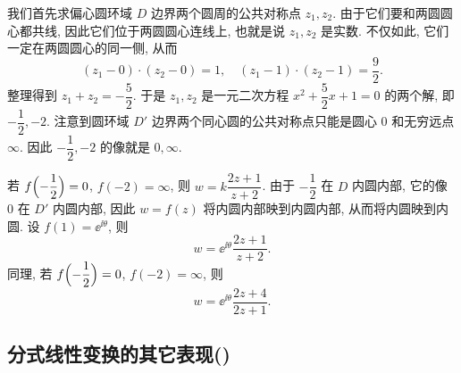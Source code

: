 \begin{solution}
  我们首先求偏心圆环域 $D$ 边界两个圆周的公共对称点 $z_1,z_2$.
  由于它们要和两圆圆心都共线, 因此它们位于两圆圆心连线上, 也就是说 $z_1,z_2$ 是实数.
  不仅如此, 它们一定在两圆圆心的同一侧, 从而
  \[
    (z_1-0)\cdot (z_2-0)=1,\quad
    (z_1-1)\cdot(z_2-1)=\frac92.
  \]
  整理得到 $z_1+z_2=-\dfrac{5}2$.
  于是 $z_1,z_2$ 是一元二次方程 $x^2+\dfrac52x+1=0$ 的两个解, 即 $-\dfrac12,-2$.
  注意到圆环域 $D'$ 边界两个同心圆的公共对称点只能是圆心 $0$ 和无穷远点 $\infty$.
  因此 $-\dfrac12,-2$ 的像就是 $0,\infty$.

  若 $f\Bigl(-\dfrac12\Bigr)=0$, $f(-2)=\infty$, 则 $w=k\dfrac{2z+1}{z+2}$.
  由于 $-\dfrac12$ 在 $D$ 内圆内部, 它的像 $0$ 在 $D'$ 内圆内部, 因此 $w=f(z)$ 将内圆内部映到内圆内部, 从而将内圆映到内圆.
  设 $f(1)=\ee^{\ii\theta}$, 则
  \[
    w=\ee^{\ii\theta}\dfrac{2z+1}{z+2}.
  \]
  同理, 若 $f\Bigl(-\dfrac12\Bigr)=0$, $f(-2)=\infty$, 则 
  \[
    w=\ee^{\ii\theta}\dfrac{2z+4}{2z+1}.
  \]
\end{solution}


\subsection{分式线性变换的其它表现(\optional)}

